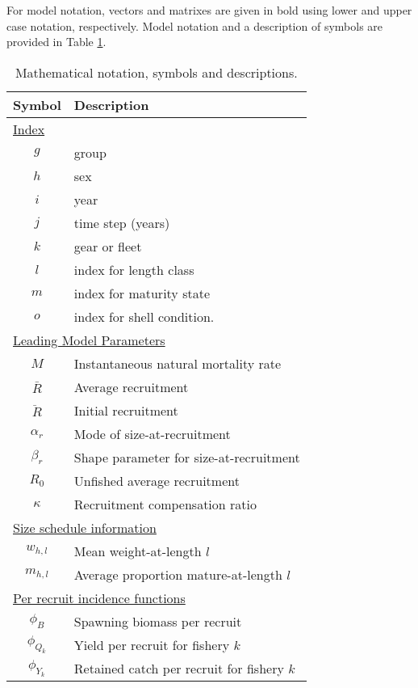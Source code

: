 \documentclass[12pt,letterpaper]{article}
\begin{document}
  For model notation, vectors and matrixes are given in bold using lower and upper case notation, respectively.  Model notation and a description of symbols are provided in Table \ref{tab:notation}.


\begin{table}
  \centering
  \caption{Mathematical notation, symbols and descriptions.}
  \label{tab:notation}
  \begin{tabular}{cl}
  \hline
  Symbol  & Description \\
  \hline
  \multicolumn{2}{l}{\underline{Index}}\\
      $g$ & group \\
      $h$ & sex \\
      $i$ & year \\
      $j$ & time step (years) \\
      $k$ & gear or fleet \\
      $l$ & index for length class \\
      $m$ & index for maturity state \\
      $o$ & index for shell condition. \\
  \multicolumn{2}{l}{\underline{Leading Model Parameters}}\\
      $M$         & Instantaneous natural mortality rate\\
      $\bar{R}$   & Average recruitment\\
      $\ddot{R}$  & Initial recruitment\\
      $\alpha_r$  & Mode of size-at-recruitment\\
      $\beta_r $  & Shape parameter for size-at-recruitment\\
      $R_0$       & Unfished average recruitment\\
      $\kappa$    & Recruitment compensation ratio\\
  \multicolumn{2}{l}{\underline{Size schedule information}}\\
      $w_{h,l}$   & Mean weight-at-length $l$ \\
      $m_{h,l}$   & Average proportion mature-at-length $l$ \\
  \multicolumn{2}{l}{\underline{Per recruit incidence functions}} \\
      $\phi_B$    & Spawning biomass per recruit \\
      $\phi_{Q_k}$& Yield per recruit for fishery $k$\\
      $\phi_{Y_k}$& Retained catch per recruit for fishery $k$ \\

\end{tabular}
\end{table}
\end{document}
